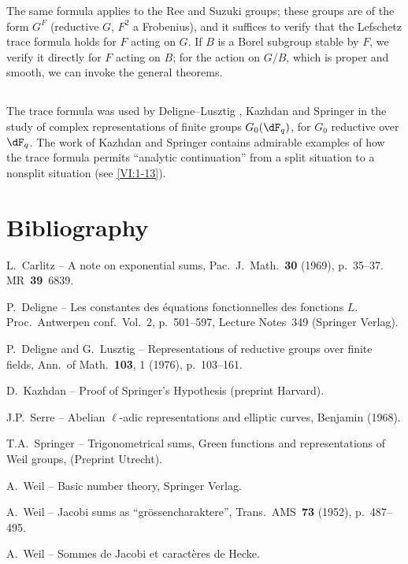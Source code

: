 \documentclass[oneside]{book}
\newcounter{char}
\theoremstyle{sga-source}
\theoremstyle{sga-source-dash}
\theoremstyle{sga-source-dotdash}
\theoremstyle{sga-source-number-note-dash}
\theoremstyle{sga-source-note-number-dotdash}
\theoremstyle{sga-source-example-dotdash}
\theoremstyle{sga-source-inline-number}
\theoremstyle{sga-source-bare-number}
\theoremstyle{sga-source}
\newcommand{\PrintPage}[1]{}\newcommand{\MathPage}[1]{}\newcommand{\PrintCite}[2]{#1}\newcommand{\var}[3]{#1}
\begin{document}
\PrintPage{231}
The same formula applies to the Ree and Suzuki groups; these groups are 
of the form $G^F$ (reductive $G$, $F^2$ a Frobenius), and it suffices to 
verify that the Lefschetz trace formula holds for $F$ acting 
on $G$. If $B$ is a Borel subgroup stable by $F$, we verify it 
directly for $F$ acting on $B$; for the action on $G/B$, which is proper and 
smooth, we can invoke the general theorems. 





\subsection{}\label{VI:8-3}

The trace formula was used by Deligne--Lusztig \cite{dl76}, 
Kazhdan \cite{ka77} and Springer \cite{sp76} in the study of 
complex representations of finite groups $G_0(\dF_q)$, for $G_0$ 
reductive over $\dF_q$. The work of Kazhdan and Springer contains 
admirable examples of how the trace formula permits ``analytic 
continuation'' from a split situation to a nonsplit situation 
(see \ref{VI:1-13}).

\PrintPage{232}
\section*{Bibliography}
\begin{enumerate}[{[}1{]}]
\item L.~Carlitz -- A note on exponential sums, Pac.~J.~Math.~\textbf{30} (1969), p.~35--37. MR~\textbf{39}~6839.
\item P.~Deligne -- Les constantes des équations fonctionnelles des fonctions $L$.
Proc.~Antwerpen conf.~Vol.~2, p.~501--597, Lecture Notes~349 (Springer Verlag).
\item P.~Deligne and G.~Lusztig -- Representations of reductive groups over finite fields,
Ann.~of Math.~\textbf{103}, 1 (1976), p.~103--161.
\item D.~Kazhdan -- Proof of Springer's Hypothesis (preprint Harvard).
\item J.P.~Serre -- Abelian $\ell$-adic representations and elliptic curves, Benjamin (1968).
\item T.A.~Springer -- Trigonometrical sums, Green functions and representations of
\var{Weil}{Weyl}{S45-ASTRA-S-0049} groups, (Preprint Utrecht).
\item A.~Weil -- Basic number theory, Springer Verlag.
\item A.~Weil -- Jacobi sums as ``gr\"ossencharaktere'', Trans.~AMS~\textbf{73} (1952), p.~487--495.
\item A.~Weil -- Sommes de Jacobi et caractères de Hecke.
\end{enumerate}
\end{document}
